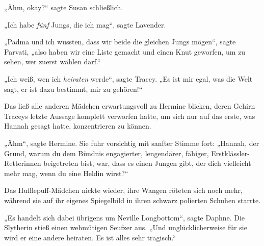 „Ähm, okay?“ sagte Susan schließlich.

„Ich habe \emph{fünf} Jungs, die ich mag“, sagte Lavender.

„Padma und ich wussten, dass wir beide die gleichen Jungs mögen“, sagte Parvati, „also haben wir eine Liste gemacht und einen Knut geworfen, um zu sehen, wer zuerst wählen darf.“

„Ich weiß, wen ich \emph{heiraten} werde“, sagte Tracey. „Es ist mir egal, was die Welt sagt, er ist dazu bestimmt, mir zu gehören!“

Das ließ alle anderen Mädchen erwartungsvoll zu Hermine blicken, deren Gehirn Traceys letzte Aussage komplett verworfen hatte, um sich nur auf das erste, was Hannah gesagt hatte, konzentrieren zu können.

„Ähm“, sagte Hermine. Sie fuhr vorsichtig mit sanfter Stimme fort: „Hannah, der Grund, warum du dem Bündnis engagierter, lengendärer, fähiger, Erstklässler-Retterinnen beigetreten bist, war, dass es einen Jungen gibt, der dich vielleicht mehr mag, wenn du eine Heldin wirst?“

Das Hufflepuff-Mädchen nickte wieder, ihre Wangen röteten sich noch mehr, während sie auf ihr eigenes Spiegelbild in ihren schwarz polierten Schuhen starrte.

„Es handelt sich dabei übrigens um Neville Longbottom“, sagte Daphne. Die Slytherin stieß einen wehmütigen Seufzer aus. „Und unglücklicherweise für sie wird er eine andere heiraten. Es ist alles sehr tragisch.“

